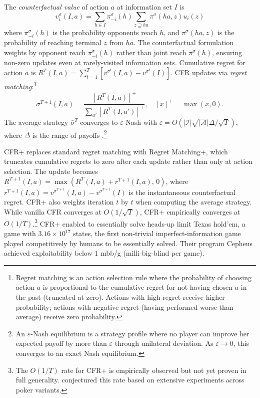 The \emph{counterfactual value} of action $a$ at information set $I$ is
\begin{equation}
v^\sigma_i(I, a) = \sum_{h \in I} \pi^\sigma_{-i}(h) \sum_{z \sqsupseteq ha} \pi^\sigma(ha, z) u_i(z)
\end{equation}
where $\pi^\sigma_{-i}(h)$ is the probability opponents reach $h$, and $\pi^\sigma(ha, z)$ is the probability of reaching terminal $z$ from $ha$. The counterfactual formulation weights by opponent reach $\pi^\sigma_{-i}(h)$ rather than joint reach $\pi^\sigma(h)$, ensuring non-zero updates even at rarely-visited information sets. Cumulative regret for action $a$ is $R^T(I,a) = \sum_{t=1}^T [v^{\sigma^t}(I,a) - v^{\sigma^t}(I)]$. CFR updates via \emph{regret matching}:\footnote{Regret matching is an action selection rule where the probability of choosing action $a$ is proportional to the cumulative regret for not having chosen $a$ in the past (truncated at zero). Actions with high regret receive higher probability; actions with negative regret (having performed worse than average) receive zero probability.}
\begin{equation}
\sigma^{T+1}(I, a) = \frac{[R^T(I, a)]^+}{\sum_{a'} [R^T(I, a')]^+}, \quad [x]^+ = \max(x,0).
\end{equation}
The average strategy $\bar{\sigma}^T$ converges to $\varepsilon$-Nash with $\varepsilon = O(|\mathcal{I}|\sqrt{|\mathcal{A}|}\Delta / \sqrt{T})$, where $\Delta$ is the range of payoffs \citep{zinkevich2008}.\footnote{An $\varepsilon$-Nash equilibrium is a strategy profile where no player can improve her expected payoff by more than $\varepsilon$ through unilateral deviation. As $\varepsilon \to 0$, this converges to an exact Nash equilibrium.}

CFR+ \citep{tammelin2014solving} replaces standard regret matching with Regret Matching+, which truncates cumulative regrets to zero after each update rather than only at action selection. The update becomes $R^{T+1}(I, a) = \max(R^T(I, a) + r^{T+1}(I, a),\, 0)$, where $r^{T+1}(I,a) = v^{\sigma^{T+1}}(I,a) - v^{\sigma^{T+1}}(I)$ is the instantaneous counterfactual regret. CFR+ also weights iteration $t$ by $t$ when computing the average strategy. While vanilla CFR converges at $O(1/\sqrt{T})$, CFR+ empirically converges at $O(1/T)$.\footnote{The $O(1/T)$ rate for CFR+ is empirically observed but not yet proven in full generality. \citet{tammelin2014solving} conjectured this rate based on extensive experiments across poker variants.} CFR+ enabled \citet{bowling2015heads} to essentially solve heads-up limit Texas hold'em, a game with $3.16 \times 10^{17}$ states, the first non-trivial imperfect-information game played competitively by humans to be essentially solved. Their program Cepheus achieved exploitability below 1 mbb/g (milli-big-blind per game).

